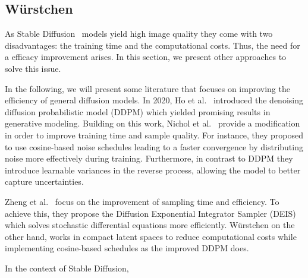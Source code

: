 \subsection{W\"urstchen}
As Stable Diffusion~\cite{rombach2022stablediffusion} models yield high image quality they come with two
disadvantages: the training time and the computational costs. Thus, the need
for a efficacy improvement arises. In this section, we present other approaches
to solve this issue.

In the following, we will present some literature that focuses on improving the
efficiency of general diffusion models. In 2020, Ho et
al.~\cite{ho2020denoisingdiffusionprobabilisticmodels} introduced
the  denoising diffusion probabilistic model (DDPM) which yielded promising
results in generative modeling. Building on this work, Nichol et
al.~\cite{Nichol2021ImprovedDenoisingDiffusionProbabilisticModels} provide a
modification in order to improve training time and sample quality. For
instance, they proposed to use cosine-based noise schedules leading to a faster
convergence by distributing noise more effectively during training.
Furthermore, in contrast to DDPM they introduce learnable variances in the
reverse process, allowing the model to better capture uncertainties.

Zheng et al.~\cite{zhang2023fastsamplingdiffusionmodels} focus on the
improvement of sampling time and efficiency. To achieve this, they propose the
Diffusion Exponential Integrator Sampler (DEIS) which solves stochastic
differential equations more efficiently. W\"urstchen on the other hand, works
in compact latent spaces to reduce computational costs while implementing
cosine-based schedules as the improved DDPM does.

In the context of Stable Diffusion,



